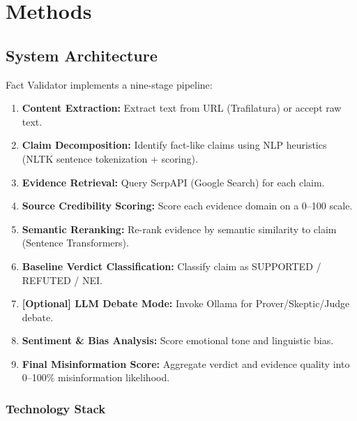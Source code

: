 \documentclass[12pt,a4paper,twoside]{article}
\begin{document}
\section{Methods}

\subsection{System Architecture}

Fact Validator implements a nine-stage pipeline:

\begin{enumerate}
    \item \textbf{Content Extraction:} Extract text from URL (Trafilatura) or accept raw text.
    \item \textbf{Claim Decomposition:} Identify fact-like claims using NLP heuristics (NLTK sentence tokenization + scoring).
    \item \textbf{Evidence Retrieval:} Query SerpAPI (Google Search) for each claim.
    \item \textbf{Source Credibility Scoring:} Score each evidence domain on a 0--100 scale.
    \item \textbf{Semantic Reranking:} Re-rank evidence by semantic similarity to claim (Sentence Transformers).
    \item \textbf{Baseline Verdict Classification:} Classify claim as SUPPORTED / REFUTED / NEI.
    \item \textbf{[Optional] LLM Debate Mode:} Invoke Ollama for Prover/Skeptic/Judge debate.
    \item \textbf{Sentiment \& Bias Analysis:} Score emotional tone and linguistic bias.
    \item \textbf{Final Misinformation Score:} Aggregate verdict and evidence quality into 0--100\% misinformation likelihood.
\end{enumerate}

\subsubsection{Technology Stack}
\end{document}
